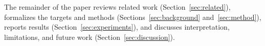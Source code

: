 The remainder of the paper reviews related work (Section~\ref{sec:related}),
formalizes the targets and methods (Sections~\ref{sec:background}
and~\ref{sec:method}), reports results (Section~\ref{sec:experiments}), and
discusses interpretation, limitations, and future work
(Section~\ref{sec:discussion}).
